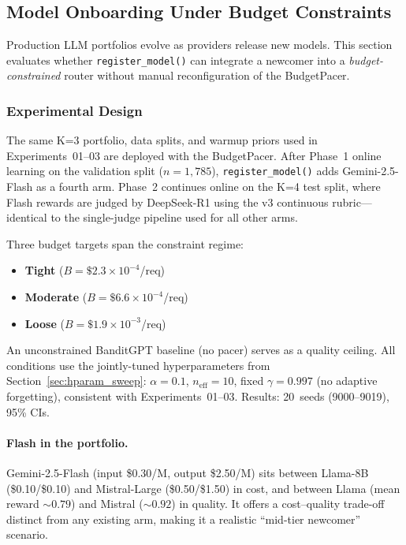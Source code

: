 
\subsection{Model Onboarding Under Budget Constraints}
\label{appendix:model_onboarding}

Production LLM portfolios evolve as providers release new models.
This section evaluates whether \texttt{register\_model()} can integrate
a newcomer into a \emph{budget-constrained} router without manual
reconfiguration of the BudgetPacer.

\subsubsection{Experimental Design}

The same K=3 portfolio, data splits, and warmup priors used in
Experiments~01--03 are deployed with the BudgetPacer.
After Phase~1 online learning on the validation split ($n{=}1{,}785$),
\texttt{register\_model()} adds Gemini-2.5-Flash as a fourth arm.
Phase~2 continues online on the K=4 test split, where Flash rewards
are judged by DeepSeek-R1 using the v3 continuous rubric---identical
to the single-judge pipeline used for all other arms.

Three budget targets span the constraint regime:
\begin{itemize}[nosep]
  \item \textbf{Tight} ($B{=}\$2.3{\times}10^{-4}$/req)
  \item \textbf{Moderate} ($B{=}\$6.6{\times}10^{-4}$/req)
  \item \textbf{Loose} ($B{=}\$1.9{\times}10^{-3}$/req)
\end{itemize}
\noindent
An unconstrained BanditGPT baseline (no pacer) serves as a quality
ceiling.  All conditions use the jointly-tuned hyperparameters from
Section~\ref{sec:hparam_sweep}: $\alpha{=}0.1$,
$n_{\mathrm{eff}}{=}10$, fixed $\gamma{=}0.997$ (no adaptive
forgetting), consistent with Experiments~01--03.
Results: 20~seeds (9000--9019), 95\% CIs.

\paragraph{Flash in the portfolio.}
Gemini-2.5-Flash (input \$0.30/M, output \$2.50/M) sits between
Llama-8B (\$0.10/\$0.10) and Mistral-Large (\$0.50/\$1.50) in cost,
and between Llama (mean reward ${\sim}0.79$) and Mistral (${\sim}0.92$)
in quality.  It offers a cost--quality trade-off distinct from any
existing arm, making it a realistic ``mid-tier newcomer'' scenario.

